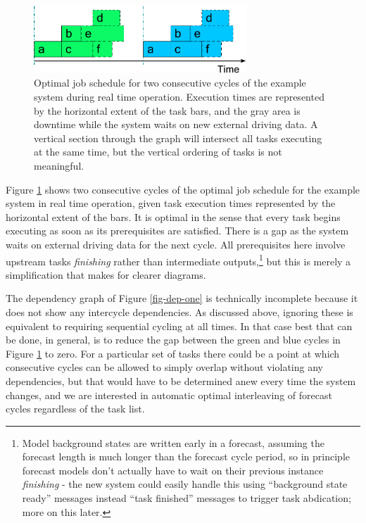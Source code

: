 \documentclass[11pt,a4paper]{article}
\begin{document}
\begin{figure}
    \begin{center}
        \includegraphics[width=8cm]{timeline-one}
    \end{center}
    \caption{\small Optimal job schedule for two consecutive cycles of
    the example system during real time operation. Execution times are
    represented by the horizontal extent of the task bars, and the gray
    area is downtime while the system waits on new external driving
    data.  A vertical section through the graph will intersect all tasks
    executing at the same time, but the vertical ordering of tasks is
    not meaningful.}
    \label{fig-time-one}
\end{figure}

Figure \ref{fig-time-one} shows two consecutive cycles of the optimal
job schedule for the example system in real time operation, given task
execution times represented by the horizontal extent of the bars. It is
optimal in the sense that every task begins executing as soon as its
prerequisites are satisfied. There is a gap as the system waits on
external driving data for the next cycle.  All prerequisites here
involve upstream tasks {\em finishing} rather than intermediate
outputs,\footnote{Model background states are written early in a
forecast, assuming the forecast length is much longer than the forecast
cycle period, so in principle forecast models don't actually have to
wait on their previous instance {\em finishing} - the new system could
easily handle this using ``background state ready'' messages instead 
``task finished'' messages to trigger task abdication; more on this
later.} but this is merely a simplification that makes for clearer
diagrams.  

The dependency graph of Figure \ref{fig-dep-one} is technically
incomplete because it does not show any intercycle dependencies.  As
discussed above, ignoring these is equivalent to requiring sequential
cycling at all times. In that case best that can be done, in general, is
to reduce the gap between the green and blue cycles in Figure
\ref{fig-time-one} to zero. For a particular set of tasks there could be
a point at which consecutive cycles can be allowed to simply overlap
without violating any dependencies, but that would have to be determined
anew every time the system changes, and we are interested in automatic
optimal interleaving of forecast cycles regardless of the task list.  
\end{document}
